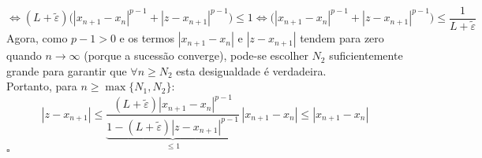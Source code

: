 \[ \Leftrightarrow (L + \tilde{\varepsilon}) \big( |x_{n+1} - x_n|^{p-1} + |z - x_{n+1}|^{p-1} \big) \leq 1
\Leftrightarrow \big( |x_{n+1} - x_n|^{p-1} + |z - x_{n+1}|^{p-1} \big) \leq \frac{1}{L + \tilde{\varepsilon}} \]
Agora, como \(p - 1 > 0\) e os termos \(|x_{n+1} - x_n|\) e \(|z - x_{n+1}|\) tendem para zero quando \(n \to \infty\) (porque a sucessão converge), pode-se escolher \(N_2\) suficientemente grande para garantir que \(\forall n \geq N_2\) esta desigualdade é verdadeira. \\
Portanto, para \(n \geq \max\{N_1, N_2\}\):
\[ |z - x_{n+1}| \leq \underbrace{\frac{(L + \tilde{\varepsilon}) |x_{n+1} - x_n|^{p-1}}{1 - (L + \tilde{\varepsilon}) |z - x_{n+1}|^{p-1}}}_{\leq 1} \, |x_{n+1} - x_n| \leq |x_{n+1} - x_n|\]
\hfill \(\square\)